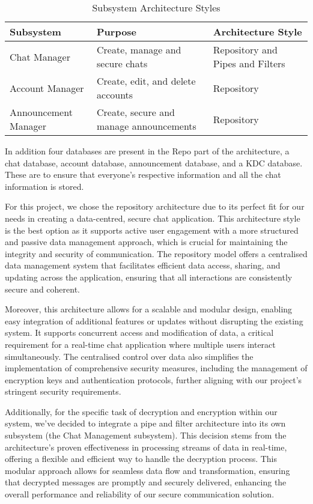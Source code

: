\documentclass[]{article}
\begin{document}
\begin{table}[h]
	\centering
	\begin{tabular}{|>{\centering\arraybackslash}m{4cm}|>{\centering\arraybackslash}m{7cm}|>{\centering\arraybackslash}m{4cm}|}
	\hline
	\textbf{Subsystem} & \textbf{Purpose} & \textbf{Architecture Style} \\ \hline
	Chat Manager & Create, manage and secure chats & Repository and Pipes and Filters \\ \hline
	Account Manager & Create, edit, and delete accounts & Repository \\ \hline
	Announcement Manager & Create, secure and manage announcements & Repository \\ \hline
	\end{tabular}
	\caption{Subsystem Architecture Styles}
	\label{table:subsystem}
\end{table}

In addition four databases are present in the Repo part of the architecture, a chat database, account database, announcement database, and a KDC database. These are to ensure that everyone’s respective information and all the chat information is stored.
\medskip

For this project, we chose the repository architecture due to its perfect fit for our needs in creating a data-centred, secure chat application. This architecture style is the best option as it supports active user engagement with a more structured and passive data management approach, which is crucial for maintaining the integrity and security of communication. The repository model offers a centralised data management system that facilitates efficient data access, sharing, and updating across the application, ensuring that all interactions are consistently secure and coherent.
\medskip

Moreover, this architecture allows for a scalable and modular design, enabling easy integration of additional features or updates without disrupting the existing system. It supports concurrent access and modification of data, a critical requirement for a real-time chat application where multiple users interact simultaneously. The centralised control over data also simplifies the implementation of comprehensive security measures, including the management of encryption keys and authentication protocols, further aligning with our project's stringent security requirements.
\medskip

Additionally, for the specific task of decryption and encryption within our system, we've decided to integrate a pipe and filter architecture into its own subsystem (the Chat Management subsystem). This decision stems from the architecture's proven effectiveness in processing streams of data in real-time, offering a flexible and efficient way to handle the decryption process. This modular approach allows for seamless data flow and transformation, ensuring that decrypted messages are promptly and securely delivered, enhancing the overall performance and reliability of our secure communication solution.
\medskip
\end{document}
